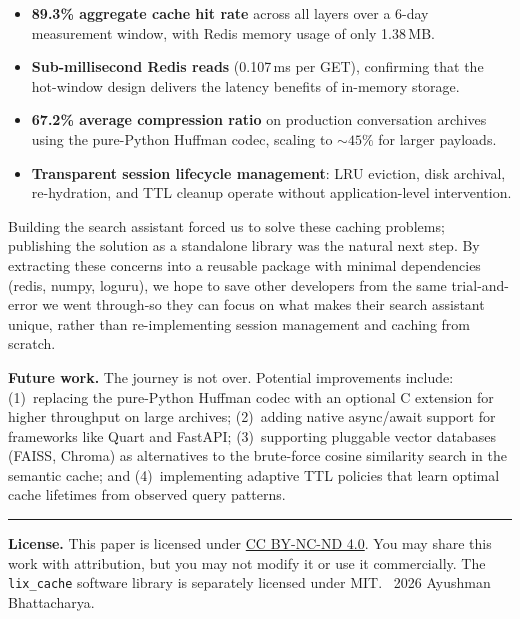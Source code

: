 \documentclass[conference]{IEEEtran}
\begin{document}
\begin{itemize}
\item \textbf{89.3\% aggregate cache hit rate} across all layers over a 6-day measurement window, with Redis memory usage of only 1.38\,MB.
\item \textbf{Sub-millisecond Redis reads} (0.107\,ms per GET), confirming that the hot-window design delivers the latency benefits of in-memory storage.
\item \textbf{67.2\% average compression ratio} on production conversation archives using the pure-Python Huffman codec, scaling to ${\sim}45\%$ for larger payloads.
\item \textbf{Transparent session lifecycle management}: LRU eviction, disk archival, re-hydration, and TTL cleanup operate without application-level intervention.
\end{itemize}

Building the search assistant forced us to solve these caching problems; publishing the solution as a standalone library was the natural next step. By extracting these concerns into a reusable package with minimal dependencies (redis, numpy, loguru), we hope to save other developers from the same trial-and-error we went through-so they can focus on what makes their search assistant unique, rather than re-implementing session management and caching from scratch.

\textbf{Future work.} The journey is not over. Potential improvements include: (1)~replacing the pure-Python Huffman codec with an optional C extension for higher throughput on large archives; (2)~adding native async/await support for frameworks like Quart and FastAPI; (3)~supporting pluggable vector databases (FAISS, Chroma) as alternatives to the brute-force cosine similarity search in the semantic cache; and (4)~implementing adaptive TTL policies that learn optimal cache lifetimes from observed query patterns.

\vspace{0.5em}
\noindent\rule{\columnwidth}{0.4pt}
{\footnotesize \textbf{License.} This paper is licensed under \href{https://creativecommons.org/licenses/by-nc-nd/4.0/}{CC BY-NC-ND 4.0}. You may share this work with attribution, but you may not modify it or use it commercially. The \texttt{lix\_cache} software library is separately licensed under MIT. \textcopyright~2026 Ayushman Bhattacharya.}
\end{document}
